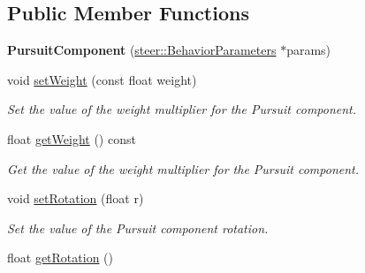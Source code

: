 \subsection*{Public Member Functions}
\begin{DoxyCompactItemize}
\item 
\hypertarget{classsteer_1_1_pursuit_component_a0042fb61e8bdad810446a3d59ac495c4}{{\bfseries Pursuit\-Component} (\hyperlink{structsteer_1_1_behavior_parameters}{steer\-::\-Behavior\-Parameters} $\ast$params)}\label{classsteer_1_1_pursuit_component_a0042fb61e8bdad810446a3d59ac495c4}

\item 
void \hyperlink{classsteer_1_1_pursuit_component_a23cb54c3718028ec7859f4350fe6dda1}{set\-Weight} (const float weight)
\begin{DoxyCompactList}\small\item\em Set the value of the weight multiplier for the Pursuit component. \end{DoxyCompactList}\item 
\hypertarget{classsteer_1_1_pursuit_component_ae361d87e084ece53b270267081e423e0}{float \hyperlink{classsteer_1_1_pursuit_component_ae361d87e084ece53b270267081e423e0}{get\-Weight} () const }\label{classsteer_1_1_pursuit_component_ae361d87e084ece53b270267081e423e0}

\begin{DoxyCompactList}\small\item\em Get the value of the weight multiplier for the Pursuit component. \end{DoxyCompactList}\item 
\hypertarget{classsteer_1_1_pursuit_component_a0098d8e1f606fd40377c8bcf581efd39}{void \hyperlink{classsteer_1_1_pursuit_component_a0098d8e1f606fd40377c8bcf581efd39}{set\-Rotation} (float r)}\label{classsteer_1_1_pursuit_component_a0098d8e1f606fd40377c8bcf581efd39}

\begin{DoxyCompactList}\small\item\em Set the value of the Pursuit component rotation. \end{DoxyCompactList}\item 
\hypertarget{classsteer_1_1_pursuit_component_ac2837285625673fc9df2a5af2c7a4457}{float \hyperlink{classsteer_1_1_pursuit_component_ac2837285625673fc9df2a5af2c7a4457}{get\-Rotation} ()}\label{classsteer_1_1_pursuit_component_ac2837285625673fc9df2a5af2c7a4457}


\end{DoxyCompactItemize}
